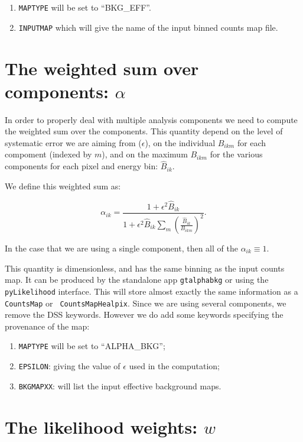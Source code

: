 \documentclass[preprint]{aastex}
\begin{document}
\begin{enumerate}
\item{{\tt MAPTYPE} will be set to ``BKG\_EFF''.}
\item{{\tt INPUTMAP} which will give the name of the input binned counts map
file.}
\end{enumerate}

\section{The weighted sum over components: $\alpha$}

In order to properly deal with multiple analysis components we need to
compute the weighted sum over the components.  This quantity depend on
the level of systematic error we are aiming from ($\epsilon$), on the
individual $B_{ikm}$ for each compoment (indexed by $m$), and on the
maximum $B_{ikm}$ for the various components for each pixel and energy
bin: $\hat{B}_{ik}$.

We define this weighted sum as:

\begin{equation}
\alpha_{ik} = \frac{1 + \epsilon^2 \hat{B}_{ik}}{1 + \epsilon^2 \hat{B}_{ik} \sum_{m} (\frac{\hat{B}_{ik}}{B_{ikm}})^2 }.
\end{equation}

\noindent In the case that we are using a single component, then all of the $\alpha_{ik} \equiv 1$.

This quantity is dimensionless, and has the same binning as the input
counts map.  It can be produced by the standalone app {\tt gtalphabkg}
or using the {\tt pyLikelihood} interface.  This will store almost
exactly the same information as a {\tt CountsMap} or {\tt
  CountsMapHealpix}. Since we are using several components, we remove 
the DSS keywords.  However we do add some keywords specifying the
provenance of the map:

\begin{enumerate}
\item{{\tt MAPTYPE} will be set to ``ALPHA\_BKG'';}
\item{{\tt EPSILON}: giving the value of $\epsilon$ used in the computation;}
\item{{\tt BKGMAPXX}: will list the input effective background maps.}    
\end{enumerate}



\section{The likelihood weights: $w$}
\end{document}
